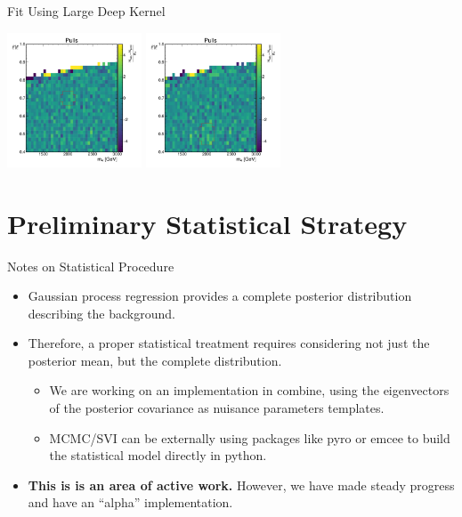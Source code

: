 \documentclass[10pt]{beamer}
\begin{document}
\begin{frame}{Fit Using Large Deep Kernel}
\begin{center}
    \includegraphics[width=0.3\textwidth]{figures/2dpullplots/nnrbf_256_128_16/E_2000_0p7_150_0p05.pdf} 
    \includegraphics[width=0.3\textwidth]{figures/2dpullplots/nnrbf_256_128_16/E_2000_0p5_150_0p07.pdf} 
  \end{center}
\end{frame}


\section[Statistical Considerations]{Preliminary Statistical Strategy}

\begin{frame}{Notes on Statistical Procedure}
  \begin{itemize}
  \item Gaussian process regression provides a complete posterior distribution describing the background. 
  \item Therefore, a proper statistical treatment requires considering not just the posterior mean, but the complete distribution.
    \begin{itemize}
    \item We are working on an implementation in combine, using the eigenvectors of the posterior covariance as nuisance parameters templates. 
    \item MCMC/SVI can be externally using packages like pyro or emcee to build the statistical model directly in python.
    \end{itemize}
  \item {\bfseries This is is an area of active work. } However, we have made steady progress and have an ``alpha'' implementation.
  \end{itemize}


\end{frame}
\end{document}

